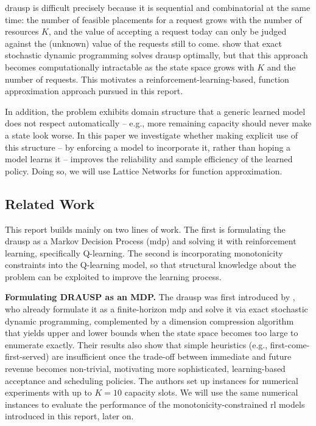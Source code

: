 \acs{drausp} is difficult precisely because it is sequential and combinatorial at the same time:
the number of feasible placements for a request grows with the number of resources $K$, and the
value of accepting a request today can only be judged against the (unknown) value of the requests
still to come. \textcite{drausp_lion18} show that exact stochastic dynamic programming solves
\acs{drausp} optimally, but that this approach becomes computationally intractable as the state
space grows with $K$ and the number of requests.
This motivates a reinforcement-learning-based, function
approximation approach pursued in this report. 

In addition, the problem exhibits domain structure
that a generic learned model does not respect automatically -- e.g., more remaining capacity should
never make a state look worse.
In this paper we investigate whether making explicit use of this structure -- by enforcing a model to incorporate it, rather than hoping a model learns it -- improves the reliability and sample efficiency of the learned policy. Doing so, we will use Lattice Networks for function approximation.



\subsection{Related Work}
\label{subsec:related-work}

This report builds mainly on two lines of work. The first is formulating the \acs{drausp} as a Markov Decision Process
(\acs{mdp}) and solving it with reinforcement learning, specifically Q-learning. The second is
incorporating monotonicity constraints into the Q-learning model, so that structural knowledge
about the problem can be exploited to improve the learning process.

\textbf{Formulating DRAUSP as an MDP.} The \acs{drausp} was first introduced by
\textcite{drausp_lion18}, who already formulate it as a finite-horizon \acs{mdp} and solve it via
exact stochastic dynamic programming, complemented by a dimension compression algorithm that
yields upper and lower bounds when the state space becomes too large to enumerate exactly. Their
results also show that simple heuristics (e.g., first-come-first-served) are insufficient once
the trade-off between immediate and future revenue becomes non-trivial, motivating more
sophisticated, learning-based acceptance and scheduling policies. The authors set up instances for
numerical experiments with up to $K=10$ capacity slots. We will use the same numerical instances
to evaluate the performance of the monotonicity-constrained \acs{rl} models introduced in this report, later on.

